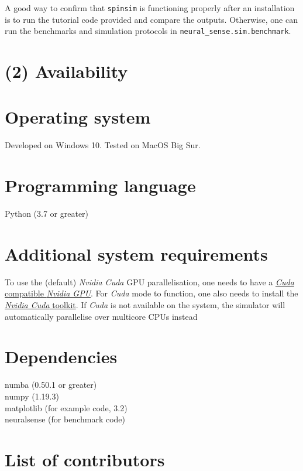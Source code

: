 \documentclass{jors}
\begin{document}
		A good way to confirm that \texttt{spinsim} is functioning properly after an installation is to run the tutorial code provided and compare the outputs. Otherwise, one can run the benchmarks and simulation protocols in \texttt{neural\_sense.sim.benchmark}.

\section*{(2) Availability}
\vspace{0.5cm}
\section*{Operating system}
Developed on Windows 10. Tested on MacOS Big Sur.

\section*{Programming language}
Python (3.7 or greater)

\section*{Additional system requirements}
To use the (default) \emph{Nvidia Cuda} GPU parallelisation, one needs to have a \href{https://developer.nvidia.com/cuda-gpus}{\emph{Cuda} compatible \emph{Nvidia GPU}}. For \emph{Cuda} mode to function, one also needs to install the \href{https://developer.nvidia.com/cuda-toolkit}{\emph{Nvidia Cuda} toolkit}. If \emph{Cuda} is not available on the system, the simulator will automatically parallelise over multicore CPUs instead

\section*{Dependencies}
numba (0.50.1 or greater)\\
numpy (1.19.3)\\
matplotlib (for example code, 3.2)\\
neuralsense (for benchmark code)

\section*{List of contributors}
\end{document}
